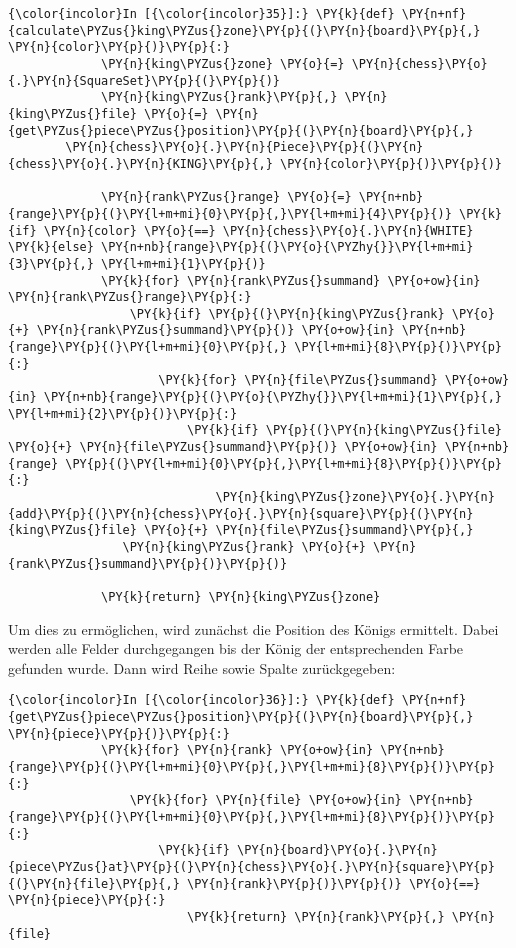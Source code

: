     \begin{Verbatim}[commandchars=\\\{\}]
{\color{incolor}In [{\color{incolor}35}]:} \PY{k}{def} \PY{n+nf}{calculate\PYZus{}king\PYZus{}zone}\PY{p}{(}\PY{n}{board}\PY{p}{,} \PY{n}{color}\PY{p}{)}\PY{p}{:}
             \PY{n}{king\PYZus{}zone} \PY{o}{=} \PY{n}{chess}\PY{o}{.}\PY{n}{SquareSet}\PY{p}{(}\PY{p}{)}
             \PY{n}{king\PYZus{}rank}\PY{p}{,} \PY{n}{king\PYZus{}file} \PY{o}{=} \PY{n}{get\PYZus{}piece\PYZus{}position}\PY{p}{(}\PY{n}{board}\PY{p}{,} 
		\PY{n}{chess}\PY{o}{.}\PY{n}{Piece}\PY{p}{(}\PY{n}{chess}\PY{o}{.}\PY{n}{KING}\PY{p}{,} \PY{n}{color}\PY{p}{)}\PY{p}{)}
         
             \PY{n}{rank\PYZus{}range} \PY{o}{=} \PY{n+nb}{range}\PY{p}{(}\PY{l+m+mi}{0}\PY{p}{,}\PY{l+m+mi}{4}\PY{p}{)} \PY{k}{if} \PY{n}{color} \PY{o}{==} \PY{n}{chess}\PY{o}{.}\PY{n}{WHITE} \PY{k}{else} \PY{n+nb}{range}\PY{p}{(}\PY{o}{\PYZhy{}}\PY{l+m+mi}{3}\PY{p}{,} \PY{l+m+mi}{1}\PY{p}{)}
             \PY{k}{for} \PY{n}{rank\PYZus{}summand} \PY{o+ow}{in} \PY{n}{rank\PYZus{}range}\PY{p}{:}
                 \PY{k}{if} \PY{p}{(}\PY{n}{king\PYZus{}rank} \PY{o}{+} \PY{n}{rank\PYZus{}summand}\PY{p}{)} \PY{o+ow}{in} \PY{n+nb}{range}\PY{p}{(}\PY{l+m+mi}{0}\PY{p}{,} \PY{l+m+mi}{8}\PY{p}{)}\PY{p}{:}
                     \PY{k}{for} \PY{n}{file\PYZus{}summand} \PY{o+ow}{in} \PY{n+nb}{range}\PY{p}{(}\PY{o}{\PYZhy{}}\PY{l+m+mi}{1}\PY{p}{,} \PY{l+m+mi}{2}\PY{p}{)}\PY{p}{:}
                         \PY{k}{if} \PY{p}{(}\PY{n}{king\PYZus{}file} \PY{o}{+} \PY{n}{file\PYZus{}summand}\PY{p}{)} \PY{o+ow}{in} \PY{n+nb}{range} \PY{p}{(}\PY{l+m+mi}{0}\PY{p}{,}\PY{l+m+mi}{8}\PY{p}{)}\PY{p}{:}
                             \PY{n}{king\PYZus{}zone}\PY{o}{.}\PY{n}{add}\PY{p}{(}\PY{n}{chess}\PY{o}{.}\PY{n}{square}\PY{p}{(}\PY{n}{king\PYZus{}file} \PY{o}{+} \PY{n}{file\PYZus{}summand}\PY{p}{,} 
				\PY{n}{king\PYZus{}rank} \PY{o}{+} \PY{n}{rank\PYZus{}summand}\PY{p}{)}\PY{p}{)}
             
             \PY{k}{return} \PY{n}{king\PYZus{}zone}
\end{Verbatim}

    Um dies zu ermöglichen, wird zunächst die Position des Königs ermittelt.
Dabei werden alle Felder durchgegangen bis der König der entsprechenden
Farbe gefunden wurde. Dann wird Reihe sowie Spalte zurückgegeben:

    \begin{Verbatim}[commandchars=\\\{\}]
{\color{incolor}In [{\color{incolor}36}]:} \PY{k}{def} \PY{n+nf}{get\PYZus{}piece\PYZus{}position}\PY{p}{(}\PY{n}{board}\PY{p}{,} \PY{n}{piece}\PY{p}{)}\PY{p}{:}
             \PY{k}{for} \PY{n}{rank} \PY{o+ow}{in} \PY{n+nb}{range}\PY{p}{(}\PY{l+m+mi}{0}\PY{p}{,}\PY{l+m+mi}{8}\PY{p}{)}\PY{p}{:}
                 \PY{k}{for} \PY{n}{file} \PY{o+ow}{in} \PY{n+nb}{range}\PY{p}{(}\PY{l+m+mi}{0}\PY{p}{,}\PY{l+m+mi}{8}\PY{p}{)}\PY{p}{:}
                     \PY{k}{if} \PY{n}{board}\PY{o}{.}\PY{n}{piece\PYZus{}at}\PY{p}{(}\PY{n}{chess}\PY{o}{.}\PY{n}{square}\PY{p}{(}\PY{n}{file}\PY{p}{,} \PY{n}{rank}\PY{p}{)}\PY{p}{)} \PY{o}{==} \PY{n}{piece}\PY{p}{:}
                         \PY{k}{return} \PY{n}{rank}\PY{p}{,} \PY{n}{file}
\end{Verbatim}

